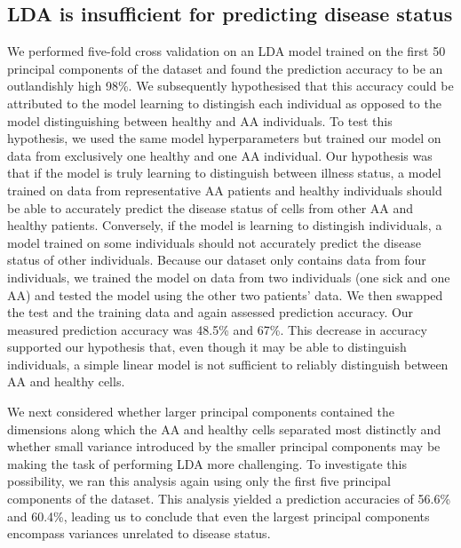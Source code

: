 \documentclass{article}
\begin{document}
\subsection{LDA is insufficient for predicting disease status}
We performed five-fold cross validation on an LDA model trained on the first 50 principal components of the dataset and found the prediction accuracy to be an outlandishly high 98\%.
We subsequently hypothesised that this accuracy could be attributed to the model learning to distingish each individual as opposed to the model distinguishing between healthy and AA individuals.
To test this hypothesis, we used the same model hyperparameters but trained our model on data from exclusively one healthy and one AA individual.
Our hypothesis was that if the model is truly learning to distinguish between illness status, a model trained on data from representative AA patients and healthy individuals should be able to accurately predict the disease status of cells from other AA and healthy patients.
Conversely, if the model is learning to distingish individuals, a model trained on some individuals should not accurately predict the disease status of other individuals.
Because our dataset only contains data from four individuals, we trained the model on data from two individuals (one sick and one AA) and tested the model using the other two patients' data.
We then swapped the test and the training data and again assessed prediction accuracy.
Our measured prediction accuracy was 48.5\% and 67\%.
This decrease in accuracy supported our hypothesis that, even though it may be able to distinguish individuals, a simple linear model is not sufficient to reliably distinguish between AA and healthy cells.

We next considered whether larger principal components contained the dimensions along which the AA and healthy cells separated most distinctly and whether small variance introduced by the smaller principal components may be making the task of performing LDA more challenging.
To investigate this possibility, we ran this analysis again using only the first five principal components of the dataset.
This analysis yielded a prediction accuracies of 56.6\% and 60.4\%, leading us to conclude that even the largest principal components encompass variances unrelated to disease status.
\end{document}

